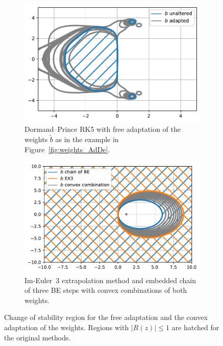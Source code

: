 \documentclass[a4paper]{article}
\numberwithin{equation}{section}
\theoremstyle{plain}
\theoremstyle{definition}
\numberwithin{theorem}{section}
\newcommand{\1}{\mathbbm{1}}
\newcommand{\bt}{\tilde{b}}
\begin{document}
\begin{figure}
     \centering
     \begin{subfigure}[b]{0.45\textwidth}
         \centering
         \includegraphics[width=\textwidth]{plots/stab_dp5.pdf}
         \caption{Dormand--Prince RK5 with free adaptation
                   of the weights $\bt$ as in the example in Figure~\ref{fig:weights_AdDe}.}
         \label{fig:stab_dp5}
     \end{subfigure}
     \hfill
     \begin{subfigure}[b]{0.45\textwidth}
         \centering
         \includegraphics[width=\textwidth]{plots/stab_ex3.pdf}
         \caption{Im-Euler~3 extrapolation method and embedded chain
                  of three BE steps with convex combinations of both
                  weights.}
         \label{fig:stab_ex3}
     \end{subfigure}
        \caption{Change of stability region for the free adaptation and
                 the convex adaptation of the weights. 
                 Regions with $|R(z)| \leq 1$ are hatched for the original methods.}
        \label{fig:stab}
\end{figure}
\end{document}
